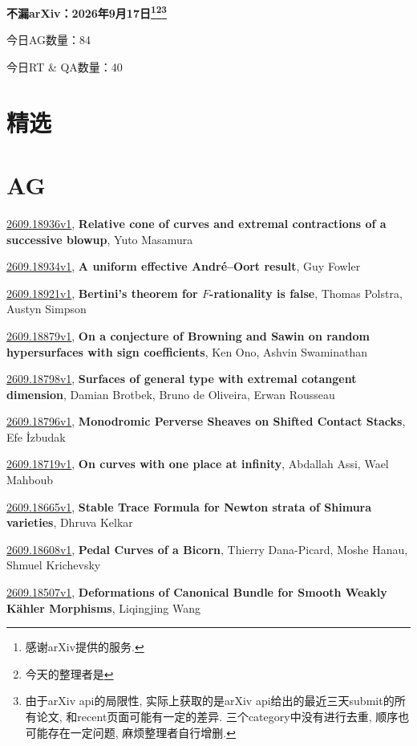 \documentclass[9pt, a4paper]{article}
\theoremstyle{plain}
\theoremstyle{definition}
\theoremstyle{remark}
\newcommand{\arxiv}[3]{\href{https://arxiv.org/abs/#1}{#1}, \textbf{\textcolor{arxivblue}{#2}}, #3}
\newcommand{\AGnumber}{84}
\newcommand{\RTQAnumber}{40}
\newcommand{\NewestDate}{2026年9月17日}
\newcommand{\todayarXiver}{} %
\begin{document}
\begin{center}
    \Huge\textbf{不漏arXiv：\NewestDate\footnote{感谢arXiv提供的服务.}\footnote{今天的整理者是\todayarXiver}\footnote{由于arXiv api的局限性, 实际上获取的是arXiv api给出的最近三天submit的所有论文, 和recent页面可能有一定的差异. 三个category中没有进行去重, 顺序也可能存在一定问题, 麻烦整理者自行增删.}} \\
\end{center}

\setcounter{section}{-1}

\begin{center}
    今日AG数量：\AGnumber
    
    今日RT \& QA数量：\RTQAnumber
    
\end{center}


\section{精选}


\section{AG}
\arxiv{2609.18936v1}{Relative cone of curves and extremal contractions of a successive blowup}{Yuto Masamura}

\arxiv{2609.18934v1}{A uniform effective André--Oort result}{Guy Fowler}

\arxiv{2609.18921v1}{Bertini's theorem for $F$-rationality is false}{Thomas Polstra, Austyn Simpson}

\arxiv{2609.18879v1}{On a conjecture of Browning and Sawin on random hypersurfaces with sign coefficients}{Ken Ono, Ashvin Swaminathan}

\arxiv{2609.18798v1}{Surfaces of general type with extremal cotangent dimension}{Damian Brotbek, Bruno de Oliveira, Erwan Rousseau}

\arxiv{2609.18796v1}{Monodromic Perverse Sheaves on Shifted Contact Stacks}{Efe İzbudak}

\arxiv{2609.18719v1}{On curves with one place at infinity}{Abdallah Assi, Wael Mahboub}

\arxiv{2609.18665v1}{Stable Trace Formula for Newton strata of Shimura varieties}{Dhruva Kelkar}

\arxiv{2609.18608v1}{Pedal Curves of a Bicorn}{Thierry Dana-Picard, Moshe Hanau, Shmuel Krichevsky}

\arxiv{2609.18507v1}{Deformations of Canonical Bundle for Smooth Weakly Kähler Morphisms}{Liqingjing Wang}
\end{document}
